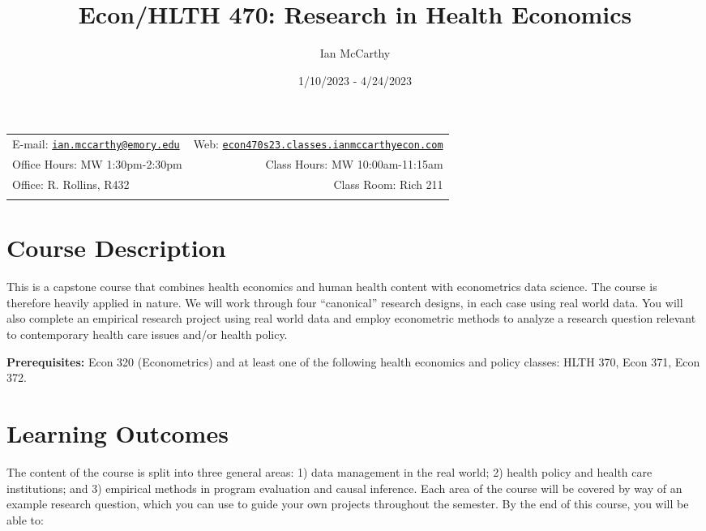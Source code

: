 \documentclass[11pt,]{article}
\title{Econ/HLTH 470: Research in Health Economics}
\author{Ian McCarthy}
\date{1/10/2023 - 4/24/2023}
\begin{document}
  

		\maketitle
		
	
		\thispagestyle{firststyle}



	\noindent \begin{tabular*}{\textwidth}{ @{\extracolsep{\fill}} lr @{\extracolsep{\fill}}}


E-mail: \texttt{\href{mailto:ian.mccarthy@emory.edu}{\nolinkurl{ian.mccarthy@emory.edu}}} & Web: \href{http://econ470s23.classes.ianmccarthyecon.com}{\tt econ470s23.classes.ianmccarthyecon.com}\\
Office Hours: MW 1:30pm-2:30pm  &  Class Hours: MW 10:00am-11:15am\\
Office: R. Rollins, R432  & Class Room: Rich 211\\
	&  \\
	\hline
	\end{tabular*}
	
\vspace{2mm}
	


\hypertarget{course-description}{%
\section{Course Description}\label{course-description}}

This is a capstone course that combines health economics and human
health content with econometrics data science. The course is therefore
heavily applied in nature. We will work through four ``canonical''
research designs, in each case using real world data. You will also
complete an empirical research project using real world data and employ
econometric methods to analyze a research question relevant to
contemporary health care issues and/or health policy.

\textbf{Prerequisites:} Econ 320 (Econometrics) and at least one of the
following health economics and policy classes: HLTH 370, Econ 371, Econ
372.

\hypertarget{learning-outcomes}{%
\section{Learning Outcomes}\label{learning-outcomes}}

The content of the course is split into three general areas: 1) data
management in the real world; 2) health policy and health care
institutions; and 3) empirical methods in program evaluation and causal
inference. Each area of the course will be covered by way of an example
research question, which you can use to guide your own projects
throughout the semester. By the end of this course, you will be able to:
\end{document}
